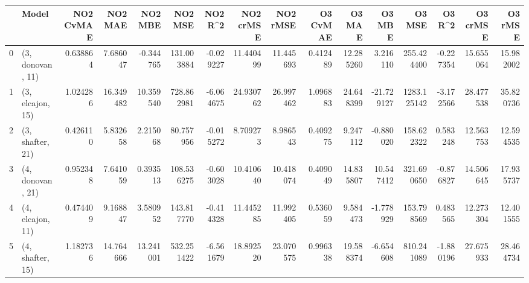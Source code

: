 \begin{tabular}{llrrrrrrrrrrrrrr}
\toprule
{} &             Model &  NO2 CvMAE &    NO2 MAE &    NO2 MBE &     NO2 MSE &   NO2 R\textasciicircum2 &  NO2 crMSE &   NO2 rMSE &  O3 CvMAE &     O3 MAE &     O3 MBE &       O3 MSE &    O3 R\textasciicircum2 &   O3 crMSE &    O3 rMSE \\
\midrule
0 &  (3, donovan, 11) &   0.638864 &   7.686047 &  -0.344765 &  131.003884 & -0.029227 &  11.440499 &  11.445693 &  0.412489 &  12.285260 &   3.216110 &   255.424400 & -0.227354 &  15.655064 &  15.982002 \\
1 &  (3, elcajon, 15) &   1.024286 &  16.349482 &  10.359540 &  728.862981 & -6.064675 &  24.930762 &  26.997462 &  1.096883 &  24.648399 & -21.729127 &  1283.125142 & -3.172566 &  28.477538 &  35.820736 \\
2 &  (3, shafter, 21) &   0.426110 &   5.832658 &   2.215068 &   80.757956 & -0.015272 &   8.709273 &   8.986543 &  0.409275 &   9.247112 &  -0.880020 &   158.622322 &  0.583248 &  12.563753 &  12.594535 \\
3 &  (4, donovan, 21) &   0.952348 &   7.641059 &   0.393513 &  108.536275 & -0.603028 &  10.410640 &  10.418074 &  0.409049 &  14.835807 &  10.547412 &   321.690650 & -0.876827 &  14.506645 &  17.935737 \\
4 &  (4, elcajon, 11) &   0.474409 &   9.168847 &   3.580952 &  143.817770 & -0.414328 &  11.445285 &  11.992405 &  0.536059 &   9.584473 &  -1.778929 &   153.798569 &  0.483565 &  12.273304 &  12.401555 \\
5 &  (4, shafter, 15) &   1.182736 &  14.764666 &  13.241001 &  532.251422 & -6.561679 &  18.892520 &  23.070575 &  0.996338 &  19.588374 &  -6.654608 &   810.241089 & -1.880196 &  27.675933 &  28.464734 \\
\bottomrule
\end{tabular}

